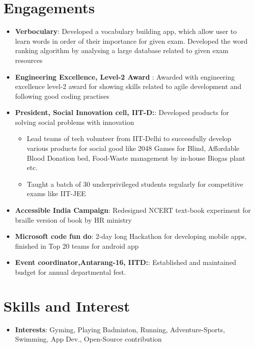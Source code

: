\documentclass[letterpaper,11pt]{article}
\newcommand{\resumeSubHeadingListStart}{\begin{itemize}[leftmargin=*]}
\newcommand{\resumeSubHeadingListEnd}{\end{itemize}}
\newcommand{\resumeItemListStart}{\begin{itemize}[leftmargin=*]}
\newcommand{\resumeItemListEnd}{\end{itemize}\vspace{-5pt}}
\newcommand{\resumeItem}[2]{
  \item\small{
    \textbf{#1}{: #2 \vspace{-2pt}}
  }
}
\newcommand{\resumeItemPointer}[1]{
  \item\small{
    {#1 \vspace{-2pt}}
  }
}
\newcommand{\resumeSubItem}[2]{
    \resumeItem{#1}{#2}\vspace{-4pt}
}
\begin{document}
\section{Engagements}
  \resumeSubHeadingListStart
    \resumeSubItem{Verboculary}
      {Developed a vocabulary building app, which allow user to learn words in order of their importance for given exam. Developed the word ranking algorithm by analysing a large database related to given exam resources}
    \resumeSubItem{Engineering Excellence, Level-2 Award }
      {Awarded with engineering excellence level-2 award for showing skills related to agile development and following good coding practises}
    \resumeSubItem{President, Social Innovation cell, IIT-D:} { Developed products for solving social problems with innovation }
      \resumeItemListStart
        \resumeItemPointer{Lead teams of tech volunteer from IIT-Delhi to successfully develop various products for social good like 2048 Games for Blind, Affordable Blood Donation bed, Food-Waste management by in-house Biogas plant etc.}
        \resumeItemPointer{Taught a batch of 30 underprivileged students regularly for competitive exams like IIT-JEE }
      \resumeItemListEnd
    \resumeSubItem{Accessible India Campaign}
      {Redesigned NCERT text-book experiment for braille version of book by HR ministry}
    \resumeSubItem{Microsoft code fun do}
      {2-day long Hackathon for developing mobile apps, finished in Top 20 teams for android app}
    
    \resumeSubItem{Event coordinator,Antarang-16, IITD:} {Established and maintained budget for annual departmental fest.}

      
  \resumeSubHeadingListEnd

\section{Skills and Interest}
  \resumeSubHeadingListStart
      \resumeSubItem{Interests}
      {Gyming, Playing Badminton, Running, Adventure-Sports, Swimming, App Dev., Open-Source contribution }
  \resumeSubHeadingListEnd
%


\end{document}
